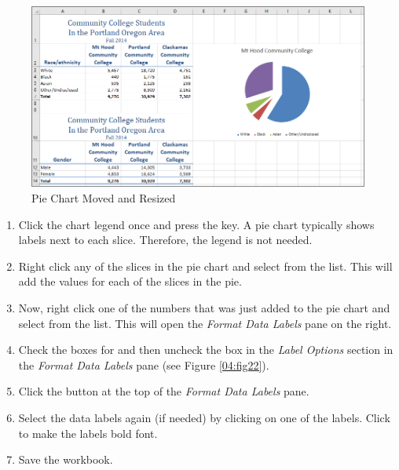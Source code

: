 \begin{figure}[H]
	\centering
	\includegraphics[width=\maxwidth{.95\linewidth}]{gfx/ch04_fig21}
	\caption{Pie Chart Moved and Resized}
	\label{04:fig21}
\end{figure}

\begin{enumerate}[resume]
	\item Click the chart legend once and press the  key. A pie chart typically shows labels next to each slice. Therefore, the legend is not needed.
	\item Right click any of the slices in the pie chart and select  from the list. This will add the values for each of the slices in the pie.
	\item Now, right click one of the numbers that was just added to the pie chart and select  from the list. This will open the \textit{Format Data Labels} pane on the right.
	\item Check the boxes for  and  then uncheck the  box in the \textit{Label Options} section in the \textit{Format Data Labels} pane (see Figure \ref{04:fig22}).
	\item Click the  button at the top of the \textit{Format Data Labels} pane.
	\item Select the data labels again (if needed) by clicking on one of the labels. Click  to make the labels bold font.
	\item Save the  workbook.
\end{enumerate}

